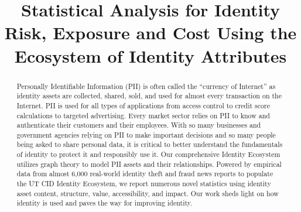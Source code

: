\documentclass[conference]{IEEEtran}
\begin{document}
\title{Statistical  Analysis  for  Identity  Risk,  Exposure  and  Cost  Using  the Ecosystem  of  Identity  Attributes
}


\maketitle

\begin{abstract}
Personally Identifiable Information (PII) is often called the ``currency of Internet'' as identity assets are collected, shared, sold, and used for almost every transaction on the Internet.  PII is used for all types of applications from access control to credit score calculations to targeted advertising.  Every market sector relies on PII to know and authenticate their customers and their employees.   With so many businesses and government agencies relying on PII to make important decisions and so many people being asked to share personal data, it is critical to better understand the fundamentals of identity to protect it and responsibly use it.  Our comprehensive Identity Ecosystem utilizes graph theory to model PII assets and their relationships.  Powered by empirical data from almost 6,000 real-world identity theft and fraud news reports to populate the UT CID Identity Ecosystem, we report numerous novel statistics using identity asset content, structure, value, accessibility, and impact.  Our work sheds light on how identity is used and paves the way for improving identity.
\end{abstract}
\end{document}
